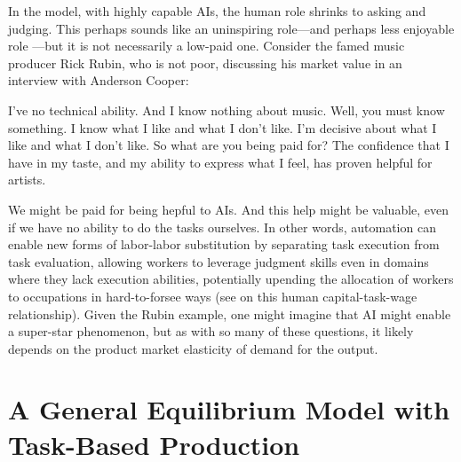\documentclass{article}
\theoremstyle{plain}
\theoremstyle{plain}
\begin{document}
In the model, with highly capable AIs, the human role shrinks to asking and judging. 
This perhaps sounds like an uninspiring role---and perhaps less enjoyable role \citep{toner2024artificial}---but it is not necessarily a low-paid one. 
Consider the famed music producer Rick Rubin, who is not poor, discussing his market value in an interview with Anderson Cooper:
\begin{dialogue}
     I've no technical ability. And I know nothing about music.
     Well, you must know something.
     I know what I like and what I don't like. I'm decisive about what I like and what I don't like.
     So what are you being paid for?
     The confidence that I have in my taste, and my ability to express what I feel, has proven helpful for artists.
\end{dialogue}
We might be paid for being hepful to AIs.
And this help might be valuable, even if we have no ability to do the tasks ourselves.
In other words, automation can enable new forms of labor-labor substitution by separating task execution from task evaluation, allowing workers to leverage judgment skills even in domains where they lack execution abilities, potentially upending the allocation of workers to occupations in hard-to-forsee ways (see \cite{autor2013putting} on this human capital-task-wage relationship).
Given the Rubin example, one might imagine that AI might enable a super-star phenomenon, but as with so many of these questions, it likely depends on the product market elasticity of demand for the output.




\section{A General Equilibrium Model with Task-Based Production}
\label{sec:taskbased_GE}
\end{document}
